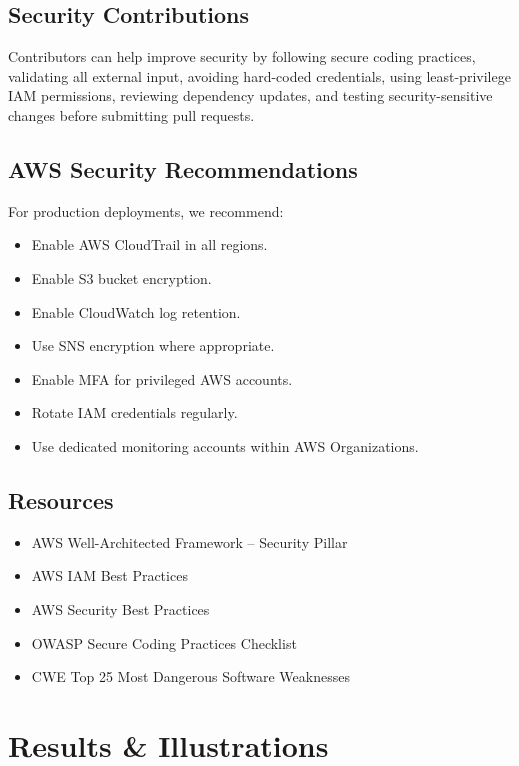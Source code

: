 \documentclass[11pt,a4paper]{report}
\begin{document}
\section{Security Contributions}

Contributors can help improve security by following secure coding
practices, validating all external input, avoiding hard-coded credentials,
using least-privilege IAM permissions, reviewing dependency updates, and
testing security-sensitive changes before submitting pull requests.

\section{AWS Security Recommendations}

For production deployments, we recommend:

\begin{itemize}[leftmargin=1.4em]
  \item Enable AWS CloudTrail in all regions.
  \item Enable S3 bucket encryption.
  \item Enable CloudWatch log retention.
  \item Use SNS encryption where appropriate.
  \item Enable MFA for privileged AWS accounts.
  \item Rotate IAM credentials regularly.
  \item Use dedicated monitoring accounts within AWS Organizations.
\end{itemize}

\section{Resources}

\begin{itemize}[leftmargin=1.4em]
  \item AWS Well-Architected Framework -- Security Pillar
  \item AWS IAM Best Practices
  \item AWS Security Best Practices
  \item OWASP Secure Coding Practices Checklist
  \item CWE Top 25 Most Dangerous Software Weaknesses
\end{itemize}

\chapter{Results \& Illustrations}
\end{document}
